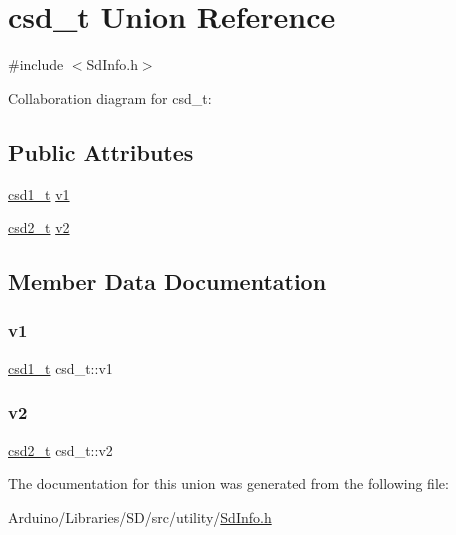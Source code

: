 \hypertarget{unioncsd__t}{}\section{csd\+\_\+t Union Reference}
\label{unioncsd__t}


{\ttfamily \#include $<$Sd\+Info.\+h$>$}



Collaboration diagram for csd\+\_\+t\+:
\subsection*{Public Attributes}
\begin{DoxyCompactItemize}
\item 
\hyperlink{_sd_info_8h_a4dc5a2aea3d7715c82094bce06e1b3a7}{csd1\+\_\+t} \hyperlink{unioncsd__t_acb1d09f122f32629d8d6faa9edcc943b}{v1}
\item 
\hyperlink{_sd_info_8h_a3e07997926302b26d47ffb0535da9d01}{csd2\+\_\+t} \hyperlink{unioncsd__t_a19b60555856c9a485bcf4a84c248bfea}{v2}
\end{DoxyCompactItemize}


\subsection{Member Data Documentation}
\mbox{\label{unioncsd__t_acb1d09f122f32629d8d6faa9edcc943b}} 
\subsubsection{\texorpdfstring{v1}{v1}}
{\footnotesize\ttfamily \hyperlink{_sd_info_8h_a4dc5a2aea3d7715c82094bce06e1b3a7}{csd1\+\_\+t} csd\+\_\+t\+::v1}

\mbox{\label{unioncsd__t_a19b60555856c9a485bcf4a84c248bfea}} 
\subsubsection{\texorpdfstring{v2}{v2}}
{\footnotesize\ttfamily \hyperlink{_sd_info_8h_a3e07997926302b26d47ffb0535da9d01}{csd2\+\_\+t} csd\+\_\+t\+::v2}



The documentation for this union was generated from the following file\+:\begin{DoxyCompactItemize}
\item 
Arduino/\+Libraries/\+S\+D/src/utility/\hyperlink{_sd_info_8h}{Sd\+Info.\+h}\end{DoxyCompactItemize}
